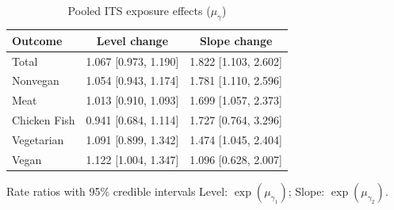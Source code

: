 \begin{table}[H]
\centering
\caption{Pooled ITS exposure effects ($\mu_\gamma$)}
\label{tab:a3_mu_gamma}
\begin{tabular}{lcc}
\toprule
Outcome & Level change & Slope change \\
\midrule
Total & 1.067 [0.973, 1.190] & 1.822 [1.103, 2.602] \\
Nonvegan & 1.054 [0.943, 1.174] & 1.781 [1.110, 2.596] \\
Meat & 1.013 [0.910, 1.093] & 1.699 [1.057, 2.373] \\
Chicken Fish & 0.941 [0.684, 1.114] & 1.727 [0.764, 3.296] \\
Vegetarian & 1.091 [0.899, 1.342] & 1.474 [1.045, 2.404] \\
Vegan & 1.122 [1.004, 1.347] & 1.096 [0.628, 2.007] \\
\bottomrule
\end{tabular}
\par\smallskip\footnotesize Rate ratios with 95\% credible intervals Level: $\exp(\mu_{\gamma_1})$; Slope: $\exp(\mu_{\gamma_2})$.
\end{table}
